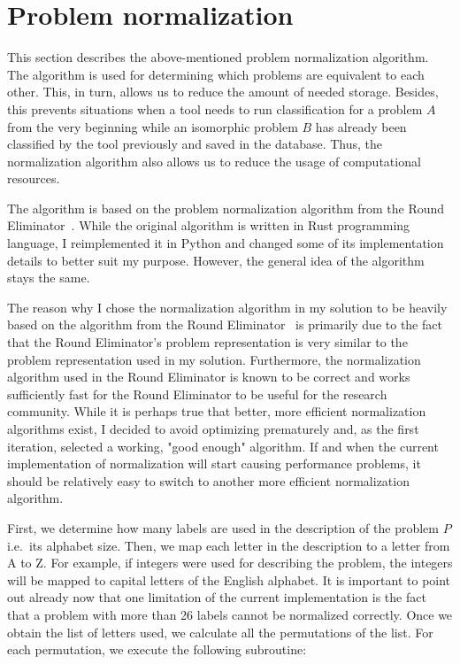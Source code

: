 \section{Problem normalization}
\label{section:problem-normalization}

This section describes the above-mentioned problem normalization
algorithm. The algorithm is used for determining which problems
are equivalent to each other. This, in turn, allows us
to reduce the amount of needed storage. Besides, this prevents
situations when a tool needs to run classification for a problem $A$
from the very beginning while an isomorphic problem $B$ has already been classified
by the tool previously and saved in the database. Thus, the normalization
algorithm also allows us to reduce the usage of computational resources.

The algorithm is based on the problem normalization algorithm
from the Round Eliminator~\cite{Olivetti2020}. While the original
algorithm is written in Rust programming language, I
reimplemented it in Python and changed some of its
implementation details to better suit my purpose.
However, the general idea of the algorithm stays the same.

The reason why I chose the normalization algorithm in my solution
to be heavily based on the algorithm from the Round Eliminator~\cite{Olivetti2020}
is primarily due to
the fact that the Round Eliminator's problem representation is very similar to the problem
representation used in my solution. Furthermore, the normalization
algorithm used in the Round Eliminator is known to be correct and works
sufficiently fast for the Round Eliminator to be useful for the research community.
While it is perhaps true that better, more efficient normalization
algorithms exist, I decided to avoid optimizing prematurely and,
as the first iteration, selected a working, "good enough" algorithm.
If and when the current implementation of normalization will start
causing performance problems, it should be relatively easy to
switch to another more efficient normalization algorithm.

First, we determine how many labels are used in the description of the
problem $P$ i.e.\ its alphabet size. Then, we map each letter in the description
to a letter from A to Z. For example, if integers were used for describing
the problem, the integers will be mapped to capital letters of
the English alphabet. It is important to point out already now that
one limitation of the current implementation is the fact that
a problem with more than 26 labels cannot be normalized correctly.
Once we obtain the list of letters used, we calculate all
the permutations of the list. For each permutation, we execute the following
subroutine:


